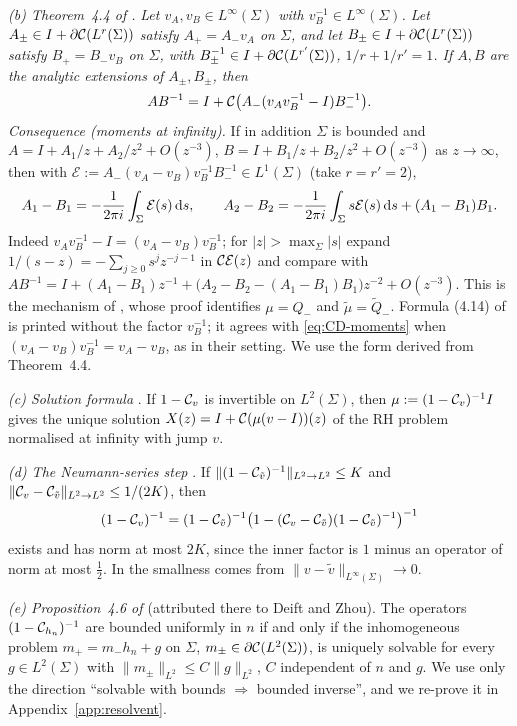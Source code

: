 \emph{(b) Theorem~4.4 of \cite{CD}.} \emph{Let $v_A,v_B\in L^\infty(\Sigma)$ with $v_B^{-1}\in L^\infty(\Sigma)$. Let
$A_\pm\in I+\partial\mathcal{C}(L^r(\Sigma))$ satisfy $A_+=A_-v_A$ on $\Sigma$, and let $B_\pm\in I+\partial\mathcal{C}(L^r(\Sigma))$ satisfy
$B_+=B_-v_B$ on $\Sigma$, with $B_\pm^{-1}\in I+\partial\mathcal{C}(L^{r'}(\Sigma))$, $1/r+1/r'=1$. If $A,B$ are the analytic
extensions of $A_\pm,B_\pm$, then}
\[
  AB^{-1}=I+\mathcal{C}\bigl(A_-(v_Av_B^{-1}-I)B_-^{-1}\bigr).
\]
\emph{Consequence (moments at infinity).} If in addition $\Sigma$ is bounded and $A=I+A_1/z+A_2/z^2+O(z^{-3})$,
$B=I+B_1/z+B_2/z^2+O(z^{-3})$ as $z\to\infty$, then with $\mathcal E:=A_-(v_A-v_B)v_B^{-1}B_-^{-1}\in L^1(\Sigma)$
(take $r=r'=2$),
\begin{equation}\label{eq:CD-moments}
  A_1-B_1=-\frac1{2\pi i}\int_\Sigma\mathcal E(s)\,\mathrm{d} s,\qquad
  A_2-B_2=-\frac1{2\pi i}\int_\Sigma s\mathcal E(s)\,\mathrm{d} s+(A_1-B_1)B_1 .
\end{equation}
Indeed $v_Av_B^{-1}-I=(v_A-v_B)v_B^{-1}$; for $|z|>\max_\Sigma|s|$ expand $1/(s-z)=-\sum_{j\ge0}s^jz^{-j-1}$ in
$\mathcal{C}\mathcal E(z)$ and compare with $AB^{-1}=I+(A_1-B_1)z^{-1}+\bigl(A_2-B_2-(A_1-B_1)B_1\bigr)z^{-2}+O(z^{-3})$.
This is the mechanism of \cite[Proposition~4.9]{CD}, whose proof identifies $\mu=Q_-$ and
$\tilde\mu=\tilde Q_-$. Formula (4.14) of \cite{CD} is printed without the factor $v_B^{-1}$; it agrees with
\eqref{eq:CD-moments} when $(v_A-v_B)v_B^{-1}=v_A-v_B$, as in their setting. We use the form derived from
Theorem~4.4.

\emph{(c) Solution formula} \cite[\S4.2]{CD}. If $1-\mathcal{C}_{v}$ is invertible on $L^2(\Sigma)$, then
$\mu:=(1-\mathcal{C}_v)^{-1}I$ gives the unique solution $X(z)=I+\mathcal{C}(\mu(v-I))(z)$ of the RH problem normalised at
infinity with jump $v$.

\emph{(d) The Neumann-series step} \cite[proof of Theorem~4.7, (4.12)--(4.13)]{CD}. If
$\|(1-\mathcal{C}_{\tilde v})^{-1}\|_{L^2\to L^2}\le K$ and $\|\mathcal{C}_v-\mathcal{C}_{\tilde v}\|_{L^2\to L^2}\le1/(2K)$, then
\[
  (1-\mathcal{C}_v)^{-1}=(1-\mathcal{C}_{\tilde v})^{-1}\bigl(1-(\mathcal{C}_v-\mathcal{C}_{\tilde v})(1-\mathcal{C}_{\tilde v})^{-1}\bigr)^{-1}
\]
exists and has norm at most $2K$, since the inner factor is $1$ minus an operator of norm at most $\frac12$. In
\cite{CD} the smallness comes from $\|v-\tilde v\|_{L^\infty(\Sigma)}\to0$.

\emph{(e) Proposition~4.6 of \cite{CD}} (attributed there to Deift and Zhou). The operators $(1-\mathcal{C}_{h_n})^{-1}$
are bounded uniformly in $n$ if and only if the inhomogeneous problem $m_+=m_-h_n+g$ on $\Sigma$,
$m_\pm\in\partial\mathcal{C}(L^2(\Sigma))$, is uniquely solvable for every $g\in L^2(\Sigma)$ with $\|m_\pm\|_{L^2}\le C\|g\|_{L^2}$, $C$
independent of $n$ and $g$. We use only the direction ``solvable with bounds $\Rightarrow$ bounded inverse'', and we
re-prove it in Appendix~\ref{app:resolvent}.

